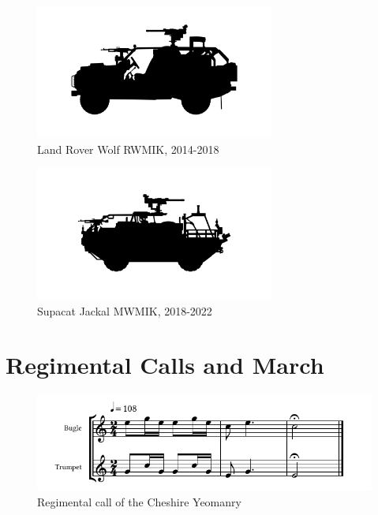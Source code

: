 \begin{figure}[h]
  \centering
  \includegraphics[width=0.7\textwidth]{platforms/wmik.pdf}
  \caption*{Land Rover Wolf RWMIK, 2014-2018}
\end{figure}

\begin{figure}[h]
  \centering
  \includegraphics[width=0.7\textwidth]{platforms/jackal.pdf}
  \caption*{Supacat Jackal MWMIK, 2018-2022}
\end{figure}

\chapter{Regimental Calls and March}

\begin{figure}[h]
  \centering
  \includegraphics[width=\textwidth]{gazette/cheshire-yeomanry-call.pdf}
  \caption*{Regimental call of the Cheshire Yeomanry~\cite[p11]{trumpet-and-bugle-calls}}
\end{figure}

\vspace{10mm}

